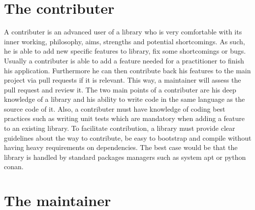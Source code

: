 \section{The contributer}

A contributer is an advanced user of a library who is very comfortable with its inner working, philosophy, aims,
strengths and potential shortcomings. As such, he is able to add new specific features to library, fix some shortcomings
or bugs. Usually a contributer is able to add a feature needed for a practitioner to finish his application. Furthermore
he can then contribute back his features to the main project via pull requests if it is relevant. This way, a maintainer
will assess the pull request and review it. The two main points of a contributer are his deep knowledge of a library and
his ability to write code in the same language as the source code of it. Also, a contributer must have knowledge of
coding best practices such as writing unit tests which are mandatory when adding a feature to an existing library. To
facilitate contribution, a library must provide clear guidelines about the way to contribute, be easy to bootstrap and
compile without having heavy requirements on dependencies. The best case would be that the library is handled by
standard packages managers such as system apt or python conan.

\section{The maintainer}

